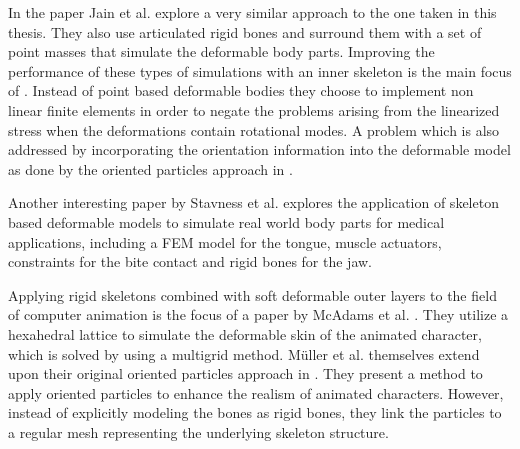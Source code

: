 In the paper \cite{Jain:2011hb} Jain et al. explore a very similar approach to the one taken in this thesis. They also use articulated rigid bones and surround them with a set of point masses that simulate the deformable body parts. Improving the performance of these types of simulations with an inner skeleton is the main focus of \cite{Kim:2011iq}. Instead of point based deformable bodies they choose to implement non linear finite elements in order to negate the problems arising from the linearized stress when the deformations contain rotational modes. A problem which is also addressed by incorporating the orientation information into the deformable model as done by the oriented particles approach in \cite{Muller:2011gn}. 

Another interesting paper by Stavness et al. \cite{Stavness:2011fn} explores the application of skeleton based deformable models to simulate real world body parts for medical applications, including a FEM model for the tongue, muscle actuators, constraints for the bite contact and rigid bones for the jaw.

Applying rigid skeletons combined with soft deformable outer layers to the field of computer animation is the focus of a paper by McAdams et al. \cite{McAdams:2011ht}. They utilize a hexahedral lattice to simulate the deformable skin of the animated character, which is solved by using a multigrid method. M{\"u}ller et al. themselves extend upon their original oriented particles approach in \cite{Muller:2011vu}. They present a method to apply oriented particles to enhance the realism of animated characters. However, instead of explicitly modeling the bones as rigid bones, they link the particles to a regular mesh representing the underlying skeleton structure.